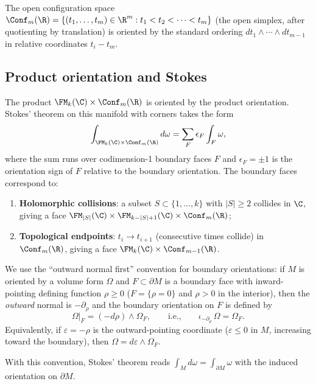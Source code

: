 The open configuration space $\Conf_m(\R) = \{(t_1,\ldots,t_m) \in \R^m : t_1 < t_2 < \cdots < t_m\}$ (the open simplex, after quotienting by translation) is oriented by the standard ordering $dt_1 \wedge \cdots \wedge dt_{m-1}$ in relative coordinates $t_i - t_m$.

\subsection{Product orientation and Stokes}

The product $\FM_k(\C) \times \Conf_m(\R)$ is oriented by the product orientation. Stokes' theorem on this manifold with corners takes the form
\begin{equation}
\label{eq:stokes-general}
\int_{\FM_k(\C) \times \Conf_m(\R)} d\omega = \sum_{F} \epsilon_F \int_F \omega,
\end{equation}
where the sum runs over codimension-1 boundary faces $F$ and $\epsilon_F = \pm 1$ is the orientation sign of $F$ relative to the boundary orientation. The boundary faces correspond to:
\begin{enumerate}
\item \textbf{Holomorphic collisions}: a subset $S \subset \{1,\ldots,k\}$ with $|S| \geq 2$ collides in $\C$, giving a face $\FM_{|S|}(\C) \times \FM_{k-|S|+1}(\C) \times \Conf_m(\R)$;
\item \textbf{Topological endpoints}: $t_i \to t_{i+1}$ (consecutive times collide) in $\Conf_m(\R)$, giving a face $\FM_k(\C) \times \Conf_{m-1}(\R)$.
\end{enumerate}

\begin{convention}
\label{conv:outward-normal}
We use the ``outward normal first'' convention for boundary orientations: if $M$ is oriented by a volume form $\Omega$ and $F\subset \partial M$ is a boundary face with inward-pointing defining function $\rho \ge 0$ ($F = \{\rho = 0\}$ and $\rho > 0$ in the interior), then the \emph{outward} normal is $-\partial_\rho$ and the boundary orientation on $F$ is defined by
\begin{equation}
\label{eq:outward-normal-rule}
\Omega\big|_F = (-d\rho) \wedge \Omega_F, \qquad\text{i.e.,}\qquad \iota_{-\partial_\rho}\,\Omega = \Omega_F.
\end{equation}
Equivalently, if $\varepsilon = -\rho$ is the outward-pointing coordinate ($\varepsilon \le 0$ in $M$, increasing toward the boundary), then $\Omega = d\varepsilon \wedge \Omega_F$.

With this convention, Stokes' theorem reads $\int_M d\omega = \int_{\partial M}\omega$ with the induced orientation on $\partial M$.
\end{convention}

